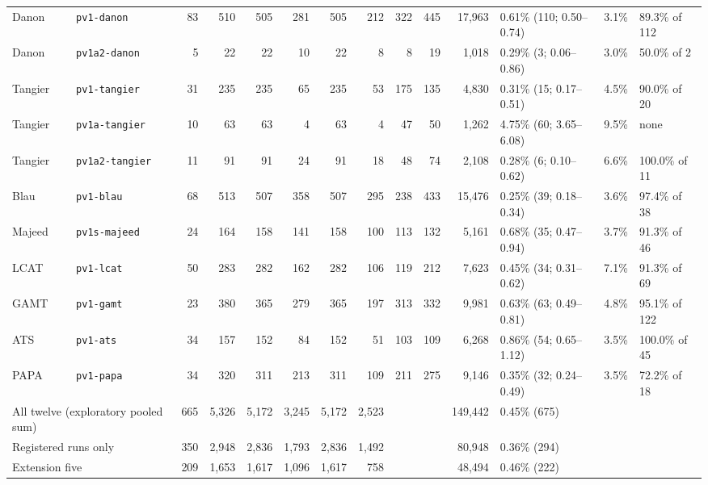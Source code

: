 \documentclass{article} %
\begin{document}
\begin{table}
\begin{center}
{\begin{tabular}{llrrrrrrrrrlll}
Danon & \texttt{pv1-danon} & 83 & 510 & 505 & 281 & 505 & 212 & 322 & 445 & 17,963 & 0.61\% (110; 0.50--0.74) & 3.1\% & 89.3\% of 112 \\
Danon & \texttt{pv1a2-danon} & 5 & 22 & 22 & 10 & 22 & 8 & 8 & 19 & 1,018 & 0.29\% (3; 0.06--0.86) & 3.0\% & 50.0\% of 2 \\
Tangier & \texttt{pv1-tangier} & 31 & 235 & 235 & 65 & 235 & 53 & 175 & 135 & 4,830 & 0.31\% (15; 0.17--0.51) & 4.5\% & 90.0\% of 20 \\
Tangier & \texttt{pv1a-tangier} & 10 & 63 & 63 & 4 & 63 & 4 & 47 & 50 & 1,262 & 4.75\% (60; 3.65--6.08) & 9.5\% & none \\
Tangier & \texttt{pv1a2-tangier} & 11 & 91 & 91 & 24 & 91 & 18 & 48 & 74 & 2,108 & 0.28\% (6; 0.10--0.62) & 6.6\% & 100.0\% of 11 \\
Blau & \texttt{pv1-blau} & 68 & 513 & 507 & 358 & 507 & 295 & 238 & 433 & 15,476 & 0.25\% (39; 0.18--0.34) & 3.6\% & 97.4\% of 38 \\
Majeed & \texttt{pv1s-majeed} & 24 & 164 & 158 & 141 & 158 & 100 & 113 & 132 & 5,161 & 0.68\% (35; 0.47--0.94) & 3.7\% & 91.3\% of 46 \\
LCAT & \texttt{pv1-lcat} & 50 & 283 & 282 & 162 & 282 & 106 & 119 & 212 & 7,623 & 0.45\% (34; 0.31--0.62) & 7.1\% & 91.3\% of 69 \\
GAMT & \texttt{pv1-gamt} & 23 & 380 & 365 & 279 & 365 & 197 & 313 & 332 & 9,981 & 0.63\% (63; 0.49--0.81) & 4.8\% & 95.1\% of 122 \\
ATS & \texttt{pv1-ats} & 34 & 157 & 152 & 84 & 152 & 51 & 103 & 109 & 6,268 & 0.86\% (54; 0.65--1.12) & 3.5\% & 100.0\% of 45 \\
PAPA & \texttt{pv1-papa} & 34 & 320 & 311 & 213 & 311 & 109 & 211 & 275 & 9,146 & 0.35\% (32; 0.24--0.49) & 3.5\% & 72.2\% of 18 \\
\midrule
\multicolumn{2}{l}{All twelve (exploratory pooled sum)} & 665 & 5,326 & 5,172 & 3,245 & 5,172 & 2,523 & & & 149,442 & 0.45\% (675) & & \\
\multicolumn{2}{l}{Registered runs only} & 350 & 2,948 & 2,836 & 1,793 & 2,836 & 1,492 & & & 80,948 & 0.36\% (294) & & \\
\multicolumn{2}{l}{Extension five} & 209 & 1,653 & 1,617 & 1,096 & 1,617 & 758 & & & 48,494 & 0.46\% (222) & & \\
\bottomrule
\end{tabular}}
\end{center}
\end{table}
\end{document}
